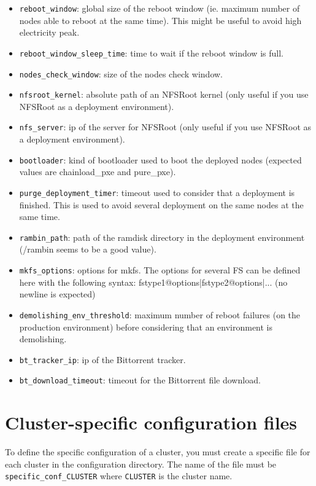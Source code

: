 \documentclass[a4wide,10pt,oneside]{book}
\begin{document}
\begin{itemize}
\item \texttt{reboot\_window}: global size of the reboot window (ie. maximum number of nodes able to reboot at the same time). This might be useful to avoid high electricity peak.
\item \texttt{reboot\_window\_sleep\_time}: time to wait if the reboot window is full.
\item \texttt{nodes\_check\_window}: size of the nodes check window.
\item \texttt{nfsroot\_kernel}: absolute path of an NFSRoot kernel (only useful if you use NFSRoot as a deployment environment).
\item \texttt{nfs\_server}: ip of the server for NFSRoot (only useful if you use NFSRoot as a deployment environment).
\item \texttt{bootloader}: kind of bootloader used to boot the deployed nodes (expected values are chainload\_pxe and pure\_pxe).
\item \texttt{purge\_deployment\_timer}: timeout used to consider that a deployment is finished. This is used to avoid several deployment on the same nodes at the same time.
\item \texttt{rambin\_path}: path of the ramdisk directory in the deployment environment (/rambin seems to be a good value).
\item \texttt{mkfs\_options}: options for mkfs. The options for several FS can be defined here with the following syntax: fstype1@options|fstype2@options|... (no newline is expected)
\item \texttt{demolishing\_env\_threshold}: maximum number of reboot failures (on the production environment) before considering that an environment is demolishing.
\item \texttt{bt\_tracker\_ip}: ip of the Bittorrent tracker.
\item \texttt{bt\_download\_timeout}: timeout for the Bittorrent file download.
\end{itemize}

\section{Cluster-specific configuration files}\label{sec:specific_config}
To define the specific configuration of a cluster, you must create a specific file for each cluster in the configuration directory. The name of the file must be \texttt{specific\_conf\_CLUSTER} where \texttt{CLUSTER} is the cluster name.
\end{document}
